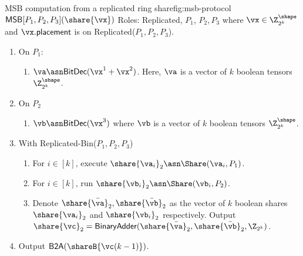 \begin{Boxfig}{MSB computation from a replicated ring share}{fig:msb-protocol}
  {$\mathsf{MSB}[P_1, P_2, P_3](\share{\vx})$}
  Roles: Replicated, $P_1$, $P_2, P_3$ where $\vx \in \Z_{2^k}^\shape$ and
  $\vx.\mathsf{placement}$ is on Replicated($P_1, P_2, P_3$).
  \begin{enumerate}
  \item On $P_1$:
  \begin{enumerate}
    \item $\va \asn \textsf{BitDec}(\vx^1 + \vx^2)$. Here, $\va$ is a vector of $k$ boolean tensors $\Z_{2^k}^\shape$.
  \end{enumerate}
  \item On $P_2$
  \begin{enumerate}
    \item $\vb \asn \textsf{BitDec}(\vx^3)$ where $\vb$ is a vector of $k$ boolean tensors $\Z_{2^k}^\shape$.
  \end{enumerate}
  \item With Replicated-Bin($P_1, P_2, P_3$)
  \begin{enumerate}
    \item For $i \in [k]$, execute $\share{\va_i}_2 \asn \Share(\va_i, P_1)$.
    \item For $i \in [k]$, run $\share{\vb_i}_2 \asn \Share(\vb_i,
    P_2)$.  
    \item Denote $\share{\bar{\va}}_2,
    \share{\bar{\vb}}_2$ as the vector of $k$ boolean shares
    $\share{\va_i}_2$ and $\share{\vb_i}_2$ respectively. Output $\share{\vc}_2 = \textsf{BinaryAdder}(\share{\bar{\va}}_2, \share{\bar{\vb}}_2, \Z_{2^k})$.
  \end{enumerate}
  \item Output $\textsf{B2A}(\shareB{\vc(k-1)})$.
\end{enumerate}

\end{Boxfig}

